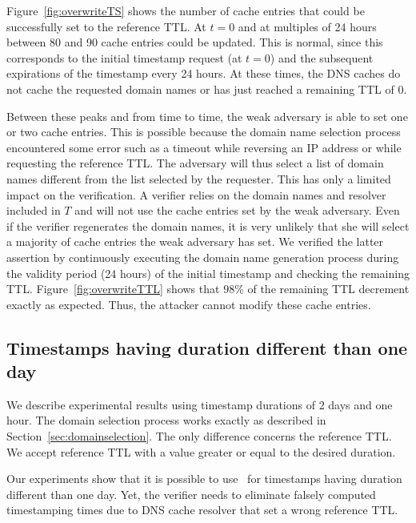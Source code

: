 Figure~\ref{fig:overwriteTS} shows the number of cache entries that could be successfully set to the reference TTL. At $t=0$ and at multiples of 24 hours between 80 and 90 cache entries could be updated. This is normal, since this corresponds to the initial timestamp request (at $t=0$) and the subsequent expirations of the timestamp every 24 hours. At these times, the DNS caches do not cache the requested domain names or has just reached a remaining TTL of 0.

Between these peaks and from time to time, the weak adversary is able to set one or two cache entries. This is possible because the domain name selection process encountered some error such as a timeout while reversing an IP address or while requesting the reference TTL. The adversary will thus select a list of domain names different from the list selected by the requester.
This has only a limited impact on the verification. A verifier relies on the domain names and resolver included in $T$ and will not use the cache entries set by the weak adversary. Even if the verifier regenerates the domain names, it is very unlikely that she will select a majority of cache entries the weak adversary has set.
We verified the latter assertion by continuously executing the domain name generation process during the validity period (24 hours) of the initial timestamp and checking the remaining TTL.
Figure~\ref{fig:overwriteTTL} shows that $98\%$ of the remaining TTL decrement exactly as expected. Thus, the attacker cannot modify these cache entries.






\subsection{Timestamps having duration different than one day}
\label{sec:moredays}





We describe experimental results using timestamp durations of 2 days and one hour.
The domain selection process works exactly as described in Section~\ref{sec:domainselection}. The only difference concerns the reference TTL. We accept reference TTL with a value greater or equal to the desired duration.

Our experiments show that it is possible to use \DNStamp\ for timestamps having duration different than one day. Yet, the verifier needs to eliminate falsely computed timestamping times due to DNS cache resolver that set a wrong reference TTL.


